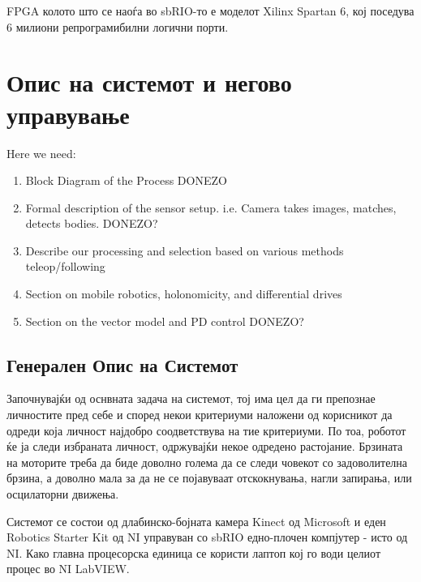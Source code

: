 \documentclass[12pt]{article}
\begin{document}
		FPGA колото што се наоѓа во sbRIO-то е моделот Xilinx Spartan 6, кој поседува 6 милиони репрограмибилни логични порти.

\newpage

\section{Опис на системот и негово управување}
  Here we need:
  \begin{enumerate}
    \item Block Diagram of the Process DONEZO
    \item Formal description of the sensor setup. i.e. Camera takes images, matches, detects bodies. DONEZO?
    \item Describe our processing and selection based on various methods teleop/following
    \item Section on mobile robotics, holonomicity, and differential drives
    \item Section on the vector model and PD control DONEZO?
    \end{enumerate}

  \subsection{Генерален Опис на Системот}
    Започнувајќи од оснвната задача на системот, тој има цел да ги препознае личностите пред себе и според некои критериуми наложени од корисникот да одреди која личност најдобро соодветствува на тие критериуми. По тоа, роботот ќе ја следи избраната личност, одржувајќи некое одредено растојание. Брзината на моторите треба да биде доволно голема да се следи човекот со задоволителна брзина, а доволно мала за да не се појавуваат отскокнувања, нагли запирања, или осцилаторни движења.

    Системот се состои од длабинско-бојната камера Kinect од Microsoft и еден Robotics Starter Kit од NI управуван со sbRIO едно-плочен компјутер - исто од NI. Како главна процесорска единица се користи лаптоп кој го води целиот процес во NI LabVIEW.
\end{document}
